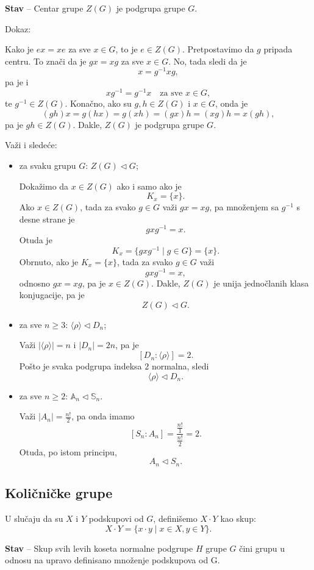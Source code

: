 \documentclass[a4paper,12pt]{article}
\newcommand{\f}[1]{\(#1\)}
\begin{document}
\textbf{Stav} -- Centar grupe \f{Z(G)} je podgrupa grupe \f{G}.

Dokaz:

Kako je $ex = xe$ za sve $x \in G$, to je $e \in Z(G)$.
Pretpostavimo da $g$ pripada centru.
To znači da je $gx = xg$ za sve $x \in G$.
No, tada sledi da je
\[
x = g^{-1}xg,
\]
pa je i
\[
xg^{-1} = g^{-1}x \quad \text{za sve } x \in G,
\]
te $g^{-1} \in Z(G)$.
Konačno, ako su $g,h \in Z(G)$ i $x \in G$, onda je
\[
(gh)x = g(hx) = g(xh) = (gx)h = (xg)h = x(gh),
\]
pa je $gh \in Z(G)$.
Dakle, $Z(G)$ je podgrupa grupe $G$.

\medskip

Važi i sledeće:
\begin{itemize}
\item za svaku grupu \f{G}: \f{Z(G) \triangleleft G};

Dokažimo da $x \in Z(G)$ ako i samo ako je
\[
K_x = \{x\}.
\]
Ako $x \in Z(G)$, tada za svako $g \in G$ važi $gx = xg$, pa množenjem sa $g^{-1}$ s desne strane je
\[
gxg^{-1} = x.
\]
Otuda je
\[
K_x = \{gxg^{-1} \mid g \in G\} = \{x\}.
\]
Obrnuto, ako je $K_x = \{x\}$, tada za svako $g \in G$ važi
\[
gxg^{-1} = x,
\]
odnosno $gx = xg$, pa je $x \in Z(G)$.
Dakle, $Z(G)$ je unija jednočlanih klasa konjugacije, pa je
\[
Z(G) \triangleleft G.
\]
\item za sve \f{n \geq 3}: \f{\langle \rho \rangle \triangleleft D_n};

Važi $|\langle \rho \rangle| = n$ i $|D_n| = 2n$, pa je
\[
[D_n : \langle \rho \rangle] = 2.
\]
Pošto je svaka podgrupa indeksa $2$ normalna, sledi
\[
\langle \rho \rangle \triangleleft D_n.
\]

\item za sve \f{n \geq 2}: \f{\mathbb{A}_n \triangleleft \mathbb{S}_n}.

Važi $|A_n| = \frac{n!}{2}$, pa onda imamo
\[
[S_n : A_n] = \frac{\frac{n!}{1}}{\frac{n!}{2}} = 2.
\]
Otuda, po istom principu,
\[
A_n \triangleleft S_n.
\]
\end{itemize}

\subsection{Količničke grupe}
U slučaju da su \f{X} i \f{Y} podskupovi od \f{G}, definišemo \f{X \cdot Y} kao skup:
\[
  X \cdot Y = \{ x \cdot y \mid x \in X, y \in Y \}.
\]

\medskip
\textbf{Stav} -- Skup svih levih koseta normalne podgrupe \f{H} grupe \f{G} čini grupu u odnosu na upravo
definisano množenje podskupova od G.
\end{document}
